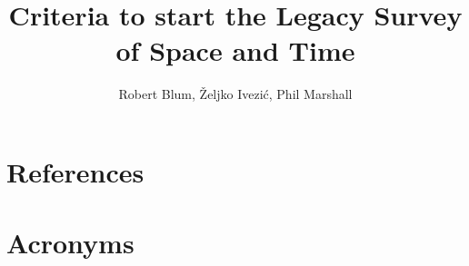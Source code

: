 \documentclass[OPS,lsstdraft,authoryear,toc]{lsstdoc}
\title{Criteria to start the Legacy Survey of Space and Time}
\author{%
Robert Blum, \v{Z}eljko Ivezi\'{c}, Phil Marshall
}
\date{\vcsDate}
\begin{document}
\maketitle









\section{References} \label{sec:bib}

\renewcommand{\refname}{} %


\section{Acronyms} \label{sec:acronyms}

\end{document}
